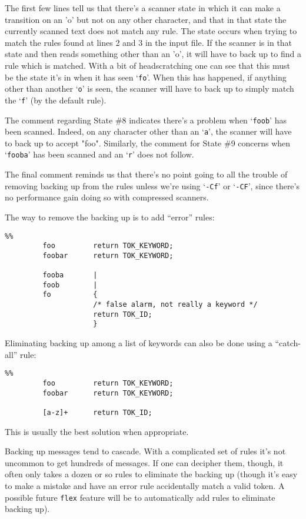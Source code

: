 \documentclass[openany,oneside]{book}
\begin{document}
The first few lines tell us that there's a scanner state in which it can
make a transition on an 'o' but not on any other character, and that in
that state the currently scanned text does not match any rule.  The
state occurs when trying to match the rules found at lines 2 and 3 in
the input file.  If the scanner is in that state and then reads
something other than an 'o', it will have to back up to find a rule
which is matched.  With a bit of headscratching one can see that this
must be the state it's in when it has seen ‘\verb`fo`’.  When this has
happened, if anything other than another ‘\verb`o`’ is seen, the scanner
will have to back up to simply match the ‘\verb`f`’ (by the default rule).

The comment regarding State \#{}8 indicates there's a problem when
‘\verb`foob`’ has been scanned.  Indeed, on any character other than an
‘\verb`a`’, the scanner will have to back up to accept "foo".  Similarly,
the comment for State \#{}9 concerns when ‘\verb`fooba`’ has been scanned and
an ‘\verb`r`’ does not follow.

The final comment reminds us that there's no point going to all the
trouble of removing backing up from the rules unless we're using
‘\verb`-Cf`’ or ‘\verb`-CF`’, since there's no performance gain doing so
with compressed scanners.

The way to remove the backing up is to add “error” rules:


\begin{verbatim}
%%
         foo         return TOK_KEYWORD;
         foobar      return TOK_KEYWORD;
     
         fooba       |
         foob        |
         fo          {
                     /* false alarm, not really a keyword */
                     return TOK_ID;
                     }
\end{verbatim}


Eliminating backing up among a list of keywords can also be done using a
“catch-all” rule:


\begin{verbatim}
%%
         foo         return TOK_KEYWORD;
         foobar      return TOK_KEYWORD;
     
         [a-z]+      return TOK_ID;
\end{verbatim}


This is usually the best solution when appropriate.

Backing up messages tend to cascade.  With a complicated set of rules
it's not uncommon to get hundreds of messages.  If one can decipher
them, though, it often only takes a dozen or so rules to eliminate the
backing up (though it's easy to make a mistake and have an error rule
accidentally match a valid token.  A possible future \verb`flex` feature
will be to automatically add rules to eliminate backing up).
\end{document}

